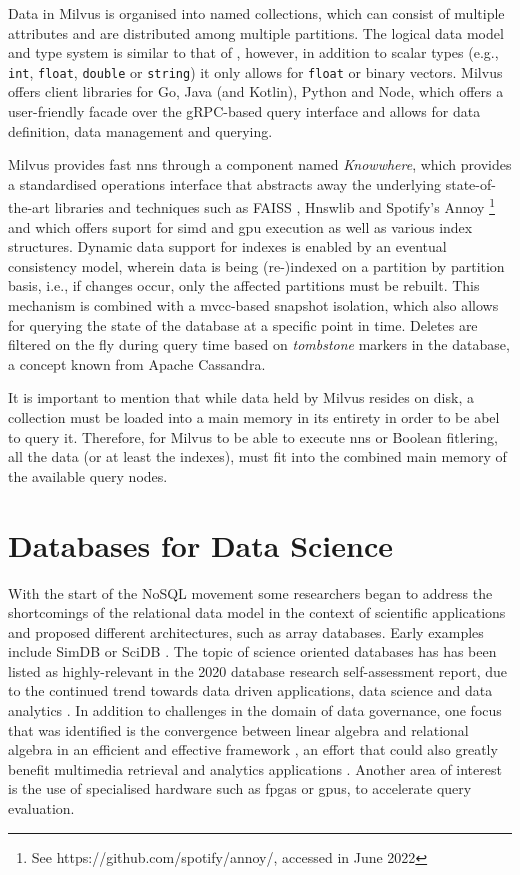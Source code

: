 Data in Milvus is organised into named collections, which can consist of multiple attributes and are distributed among multiple partitions. The logical data model and type system is similar to that of \cottontail{}, however, in addition to scalar types (e.g., \texttt{int}, \texttt{float}, \texttt{double} or \texttt{string}) it only allows for \texttt{float} or binary vectors. Milvus offers client libraries for Go, Java (and Kotlin), Python and Node, which offers a user-friendly facade over the gRPC-based query interface and allows for data definition, data management and querying.

Milvus provides fast \acrshort{nns} through a component named \emph{Knowwhere}, which provides a standardised operations interface that abstracts away the underlying state-of-the-art libraries and techniques such as FAISS \cite{Johnson:2019Billion}, Hnswlib \cite{Malkov:2018Efficient} and Spotify's Annoy \footnote{See https://github.com/spotify/annoy/, accessed in June 2022} and which offers suport for \acrshort{simd} and \acrshort{gpu} execution as well as various index structures. Dynamic data support for indexes is enabled by an eventual consistency model, wherein data is being (re-)indexed on a partition by partition basis, i.e., if changes occur, only the affected partitions must be rebuilt. This mechanism is combined with a \acrshort{mvcc}-based snapshot isolation, which also allows for querying the state of the database at a specific point in time. Deletes are filtered on the fly during query time based on \emph{tombstone} markers in the database, a concept known from Apache Cassandra.

It is important to mention that while data held by Milvus resides on disk, a collection must be loaded into a main memory in its entirety in order to be abel to query it. Therefore, for Milvus to be able to execute \acrshort{nns} or Boolean fitlering, all the data (or at least the indexes), must fit into the combined main memory of the available query nodes.

\section{Databases for Data Science}
With the start of the NoSQL movement some researchers began to address the shortcomings of the relational data model in the context of scientific applications and proposed different architectures, such as array databases. Early examples include SimDB \cite{Silva:2010SimDB} or SciDB \cite{Stonebraker:2011Architecture,Stonebraker:2013SciDB}. The topic of science oriented databases has has been listed as highly-relevant in the 2020 database research self-assessment report, due to the continued trend towards data driven applications, data science and data analytics \cite{Abadi:2020Seattle}. In addition to challenges in the domain of data governance, one focus that was identified is the convergence between linear algebra and relational algebra in an efficient and effective framework \cite{Luo:2018Scalable}, an effort that could also greatly benefit multimedia retrieval and analytics applications \cite{Berry:1995Using}. Another area of interest is the use of specialised hardware such as \acrshort{fpga}s or \acrshort{gpu}s, to accelerate query evaluation.
 
